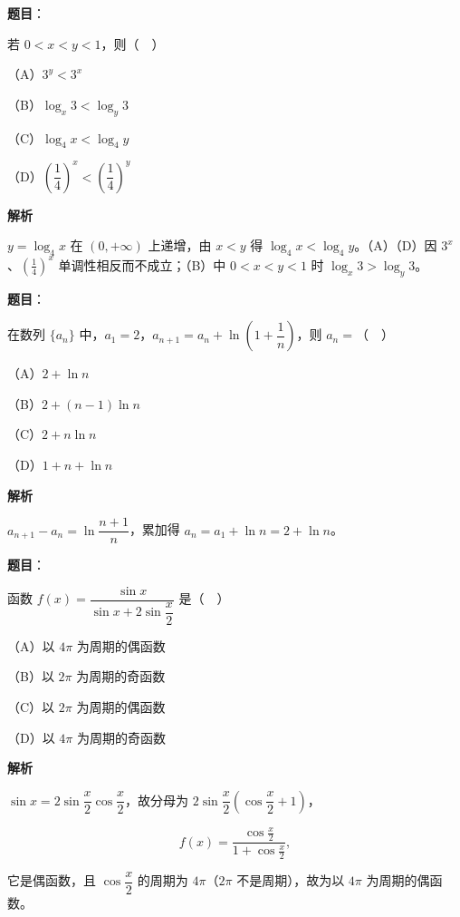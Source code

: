 \begin{answer}

\textbf{题目}：

若 $0<x<y<1$，则（　）

（A）$3^y<3^x$

（B）$\log_x3<\log_y3$

（C）$\log_4x<\log_4y$

（D）$\left(\dfrac14\right)^x<\left(\dfrac14\right)^y$

\textbf{解析}

$y=\log_4x$ 在 $(0,+\infty)$ 上递增，由 $x<y$ 得 $\log_4x<\log_4y$。（A）（D）因 $3^x$、$\left(\frac14\right)^x$ 单调性相反而不成立；（B）中 $0<x<y<1$ 时 $\log_x3>\log_y3$。


\end{answer}
\begin{answer}

\textbf{题目}：

在数列 $\{a_n\}$ 中，$a_1=2$，$a_{n+1}=a_n+\ln\left(1+\dfrac1n\right)$，则 $a_n=$（　）

（A）$2+\ln n$

（B）$2+(n-1)\ln n$

（C）$2+n\ln n$

（D）$1+n+\ln n$

\textbf{解析}

$a_{n+1}-a_n=\ln\dfrac{n+1}n$，累加得 $a_n=a_1+\ln n=2+\ln n$。


\end{answer}
\begin{answer}

\textbf{题目}：

函数 $f(x)=\dfrac{\sin x}{\sin x+2\sin\dfrac x2}$ 是（　）

（A）以 $4\pi$ 为周期的偶函数

（B）以 $2\pi$ 为周期的奇函数

（C）以 $2\pi$ 为周期的偶函数

（D）以 $4\pi$ 为周期的奇函数

\textbf{解析}

$\sin x=2\sin\dfrac x2\cos\dfrac x2$，故分母为 $2\sin\dfrac x2\left(\cos\dfrac x2+1\right)$，

\nopagebreak[4]
\[f(x)=\frac{\cos\frac x2}{1+\cos\frac x2},\]

它是偶函数，且 $\cos\dfrac x2$ 的周期为 $4\pi$（$2\pi$ 不是周期），故为以 $4\pi$ 为周期的偶函数。


\end{answer}
